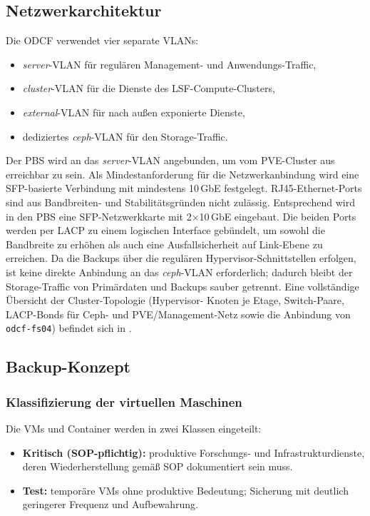 \subsection{Netzwerkarchitektur}
\label{sec:Netzwerk}
Die \ac{ODCF} verwendet vier separate \acp{VLAN}:
\begin{itemize}
    \item \emph{server}-\ac{VLAN} für regulären Management- und
          Anwendungs-Traffic,
    \item \emph{cluster}-\ac{VLAN} für die Dienste des
          \ac{LSF}-Compute-Clusters,
    \item \emph{external}-\ac{VLAN} für nach außen exponierte Dienste,
    \item dediziertes \emph{ceph}-\ac{VLAN} für den Storage-Traffic.
\end{itemize}
Der \ac{PBS} wird an das \emph{server}-\ac{VLAN} angebunden, um vom
\ac{PVE}-Cluster aus erreichbar zu sein.
Als Mindestanforderung für die Netzwerkanbindung wird eine
\ac{SFP}-basierte Verbindung mit mindestens 10\,GbE festgelegt.
RJ45-Ethernet-Ports sind aus Bandbreiten- und Stabilitätsgründen
nicht zulässig. Entsprechend wird in den \ac{PBS} eine
\ac{SFP}-Netzwerkkarte mit 2$\times$10\,GbE eingebaut. Die beiden
Ports werden per \ac{LACP} zu einem logischen Interface gebündelt,
um sowohl die Bandbreite zu erhöhen als auch eine Ausfallsicherheit
auf Link-Ebene zu erreichen.
Da die Backups über die regulären Hypervisor-Schnittstellen erfolgen,
ist keine direkte Anbindung an das \emph{ceph}-\ac{VLAN} erforderlich;
dadurch bleibt der Storage-Traffic von Primärdaten und Backups
sauber getrennt.
Eine vollständige Übersicht der Cluster-Topologie (Hypervisor-
Knoten je Etage, Switch-Paare, \ac{LACP}-Bonds für Ceph- und
\ac{PVE}/Management-Netz sowie die Anbindung von
\texttt{odcf-fs04}) befindet sich in
.


\subsection{Backup-Konzept}
\label{sec:Backupkonzept}

\subsubsection*{Klassifizierung der virtuellen Maschinen}
Die \acp{VM} und Container werden in zwei Klassen eingeteilt:
\begin{itemize}
    \item \textbf{Kritisch (\ac{SOP}-pflichtig):} produktive
          Forschungs- und Infrastrukturdienste, deren Wiederherstellung
          gemäß \acl{SOP} dokumentiert sein muss.
    \item \textbf{Test:} temporäre \acp{VM} ohne produktive Bedeutung;
          Sicherung mit deutlich geringerer Frequenz und Aufbewahrung.
\end{itemize}

